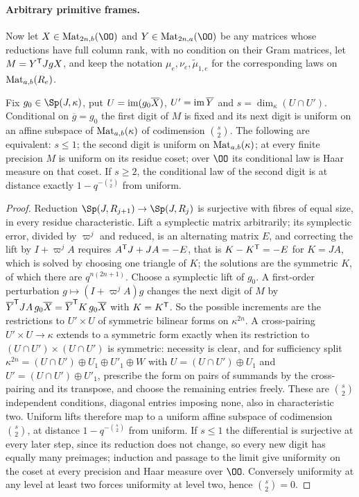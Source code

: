 \paragraph{Arbitrary primitive frames.}
Now let $X\in\spnMat_{2n,b}(\OO)$ and $Y\in\spnMat_{2n,a}(\OO)$ be any matrices whose reductions
have full column rank, with no condition on their Gram matrices, let $M=Y^{\mathsf{T}}JgX$, and keep
the notation $\mu_e,\nu_e,\widetilde\mu_{1,e}$ for the corresponding laws on
$\operatorname{Mat}_{a,b}(R_e)$.

\begin{theorem}\label{spn:thm:padic-tangent}
Fix $g_0\in\Sp(J,\kappa)$, put $U=\operatorname{im}(g_0\overline X)$, $U'=\operatorname{im}\overline Y$ and
$s=\dim_\kappa(U\cap U')$. Conditional on $\overline g=g_0$ the first digit of $M$ is fixed and its
next digit is uniform on an affine subspace of $\operatorname{Mat}_{a,b}(\kappa)$ of codimension $\binom s2$. The
following are equivalent: $s\le1$; the second digit is uniform on $\operatorname{Mat}_{a,b}(\kappa)$; at every
finite precision $M$ is uniform on its residue coset; over $\OO$ its conditional law is Haar
measure on that coset. If $s\ge2$, the conditional law of the second digit is at distance exactly
$1-q^{-\binom s2}$ from uniform.
\end{theorem}

\begin{proof}
Reduction $\Sp(J,R_{j+1})\to\Sp(J,R_j)$ is surjective with fibres of equal size, in every residue
characteristic. Lift a symplectic matrix arbitrarily; its symplectic error, divided by $\varpi^j$
and reduced, is an alternating matrix $E$, and correcting the lift by $I+\varpi^jA$ requires
$A^{\mathsf{T}}J+JA=-E$, that is $K-K^{\mathsf{T}}=-E$ for $K=JA$, which is solved by choosing one triangle of
$K$; the solutions are the symmetric $K$, of which there are $q^{n(2n+1)}$. Choose a symplectic lift
of $g_0$. A first-order perturbation $g\mapsto(I+\varpi^jA)g$ changes the next digit of $M$ by
$\overline Y^{\mathsf{T}}JA\,g_0\overline X=\overline Y^{\mathsf{T}}K\,g_0\overline X$ with $K=K^{\mathsf{T}}$. So
the possible increments are the restrictions to $U'\times U$ of symmetric bilinear forms on
$\kappa^{2n}$. A cross-pairing $U'\times U\to\kappa$ extends to a symmetric form exactly when its
restriction to $(U\cap U')\times(U\cap U')$ is symmetric: necessity is clear, and for sufficiency
split $\kappa^{2n}=(U\cap U')\oplus U_1\oplus U'_1\oplus W$ with $U=(U\cap U')\oplus U_1$ and
$U'=(U\cap U')\oplus U'_1$, prescribe the form on pairs of summands by the cross-pairing and its
transpose, and choose the remaining entries freely. These are $\binom s2$ independent conditions,
diagonal entries imposing none, also in characteristic two. Uniform lifts therefore map to a
uniform affine subspace of codimension $\binom s2$, at distance $1-q^{-\binom s2}$ from uniform. If
$s\le1$ the differential is surjective at every later step, since its reduction does not change,
so every new digit has equally many preimages; induction and passage to the limit give uniformity
on the coset at every precision and Haar measure over $\OO$. Conversely uniformity at any level at
least two forces uniformity at level two, hence $\binom s2=0$.
\end{proof}

